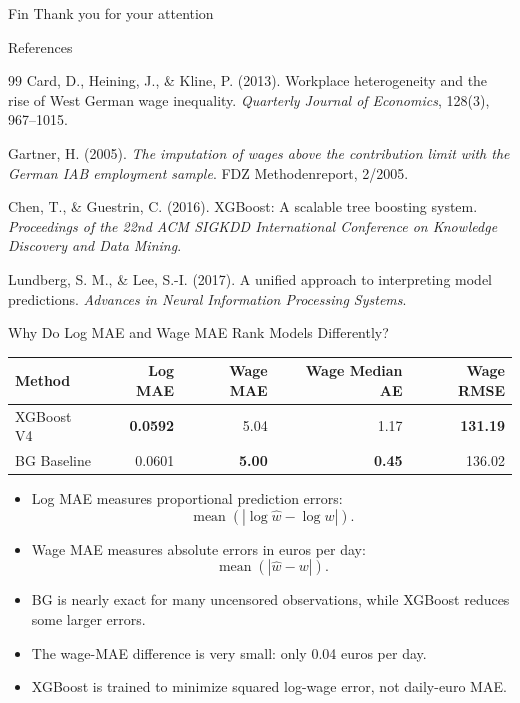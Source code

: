 \documentclass[10pt]{beamer}
\begin{document}
\begin{frame}{Fin}
    Thank you for your attention
\end{frame}

\begin{frame}{References}
\footnotesize
\begin{thebibliography}{99}
Card, D., Heining, J., \& Kline, P. (2013).
Workplace heterogeneity and the rise of West German wage inequality.
\emph{Quarterly Journal of Economics}, 128(3), 967--1015.

Gartner, H. (2005).
\emph{The imputation of wages above the contribution limit with the German IAB employment sample}.
FDZ Methodenreport, 2/2005.

Chen, T., \& Guestrin, C. (2016).
XGBoost: A scalable tree boosting system.
\emph{Proceedings of the 22nd ACM SIGKDD International Conference on Knowledge Discovery and Data Mining}.

Lundberg, S. M., \& Lee, S.-I. (2017).
A unified approach to interpreting model predictions.
\emph{Advances in Neural Information Processing Systems}.
\end{thebibliography}
\end{frame}

\begin{frame}{Why Do Log MAE and Wage MAE Rank Models Differently?}
\small
\centering
\begin{tabular}{lrrrr}
\toprule
Method & Log MAE & Wage MAE & Wage Median AE & Wage RMSE \\
\midrule
XGBoost V4 & \textbf{0.0592} & 5.04 & 1.17 & \textbf{131.19} \\
BG Baseline & 0.0601 & \textbf{5.00} & \textbf{0.45} & 136.02 \\
\bottomrule
\end{tabular}

\vspace{0.35cm}
\begin{itemize}
    \item Log MAE measures proportional prediction errors:
    \[
    \operatorname{mean}\left(\left|\log \hat{w}-\log w\right|\right).
    \]
    \item Wage MAE measures absolute errors in euros per day:
    \[
    \operatorname{mean}\left(\left|\hat{w}-w\right|\right).
    \]
    \item BG is nearly exact for many uncensored observations, while XGBoost reduces some larger errors.
    \item The wage-MAE difference is very small: only 0.04 euros per day.
    \item XGBoost is trained to minimize squared log-wage error, not daily-euro MAE.
\end{itemize}
\end{frame}
\end{document}
